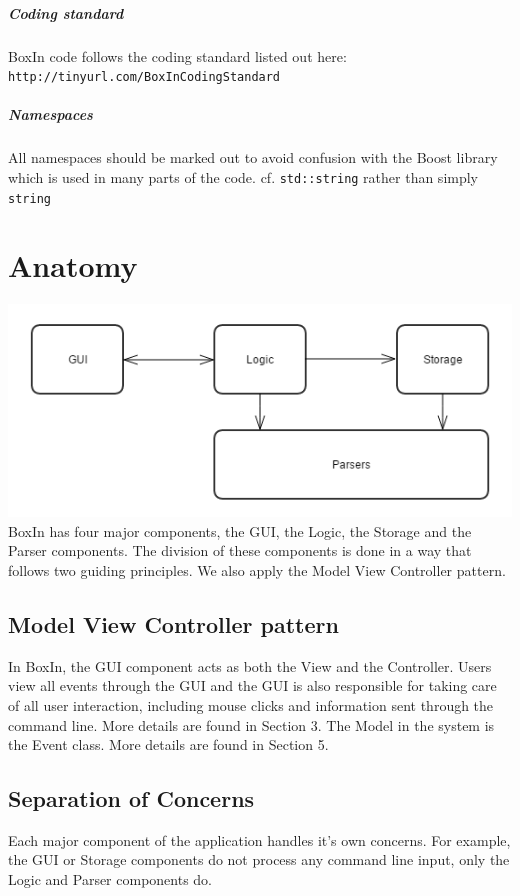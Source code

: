\documentclass[12pt]{extarticle}
\begin{document}
\subparagraph{Coding standard}
BoxIn code follows the coding standard listed out here:\\ \texttt{http://tinyurl.com/BoxInCodingStandard}

\subparagraph{Namespaces}
All namespaces should be marked out to avoid confusion with the Boost library which is used in many parts of the code. cf. \texttt{std::string} rather than simply \texttt{string}\\

\section{Anatomy}

\includegraphics[width=\textwidth/2]{architecture}\\

BoxIn has four major components, the GUI, the Logic, the Storage and the Parser components. The division of these components is done in a way that follows two guiding principles. We also apply the Model View Controller pattern.

\subsection{Model View Controller pattern}
In BoxIn, the GUI component acts as both the View and the Controller. Users view all events through the GUI and the GUI is also responsible for taking care of all user interaction, including mouse clicks and information sent through the command line. More details are found in Section 3.
The Model in the system is the Event class. More details are found in Section 5.

\subsection{Separation of Concerns}
Each major component of the application handles it's own concerns. For example, the GUI or Storage components do not process any command line input, only the Logic and Parser components do.
\end{document}

